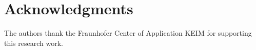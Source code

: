 \section*{Acknowledgments}
The authors thank the Fraunhofer Center of Application KEIM for supporting this research work.

